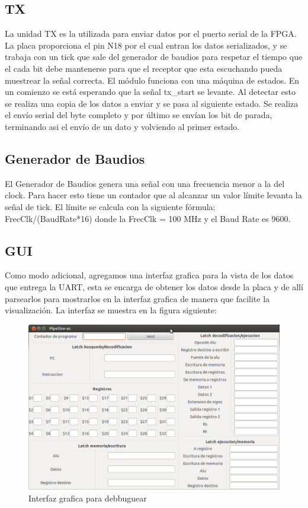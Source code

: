 \subsection{TX}
La unidad TX es la utilizada para enviar datos por el puerto serial de la FPGA. La placa proporciona el pin N18 por el cual entran los datos serializados, y se trabaja con un tick que sale del generador de baudios para respetar el tiempo que el cada bit debe mantenerse para que el receptor que esta escuchando pueda muestrear la señal correcta.
El m\'odulo funciona con una m\'aquina de estados. En un comienzo se est\'a esperando que la señal tx\_start se levante. Al detectar esto se realiza una copia de los datos a enviar y se pasa al siguiente estado. Se realiza el env\'io serial del byte completo y por \'ultimo se env\'ian los bit de parada, terminando asi el env\'io de un dato y volviendo al primer estado.  


\subsection{Generador de Baudios}
El Generador de Baudios genera una señal con una frecuencia menor a la del clock. Para hacer esto tiene un contador que al alcanzar un valor l\'imite levanta la señal de tick. El l\'imite se calcula con la siguiente f\'ormula: FrecClk/(BaudRate*16) donde la FrecClk = 100 MHz y el Baud Rate es 9600.

\subsection{GUI}
Como modo adicional, agregamos una interfaz grafica para la vista de los datos que entrega la UART, esta se encarga de obtener los datos desde la placa y de all\'i parsearlos para mostrarlos en la interfaz grafica de manera que facilite la visualizaci\'on. La interfaz se muestra en la figura siguiente:

\begin{figure}[H]
\centering
\includegraphics[scale=0.35]{img/pipelinegui}
\caption{Interfaz grafica para debbuguear}
\label{fig:latchifid}
\end{figure}